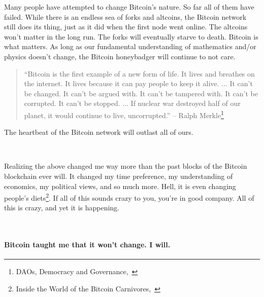 Many people have attempted to change Bitcoin's nature. So far all of
them have failed. While there is an endless sea of forks and altcoins,
the Bitcoin network still does its thing, just as it did when the first
node went online. The altcoins won't matter in the long run. The forks
will eventually starve to death. Bitcoin is what matters. As long as our
fundamental understanding of mathematics and/or physics doesn't change,
the Bitcoin honeybadger will continue to not care.

\begin{quotation}
``Bitcoin is the first example of a new form of life. It lives and
breathes on the internet. It lives because it can pay people to keep
it alive. ... It can't be changed. It can't be argued with. It
can't be tampered with. It can't be corrupted. It can't be stopped.
... If nuclear war destroyed half of our planet, it would continue
to live, uncorrupted.''
\flushright -- Ralph Merkle\footnote{DAOs, Democracy and
Governance,~\cite{merkle-dao}}
\end{quotation}

The heartbeat of the Bitcoin network will outlast all of ours.

~

Realizing the above changed me way more than the past blocks of the Bitcoin
blockchain ever will. It changed my time preference, my understanding of
economics, my political views, and so much more. Hell, it is even changing
people's diets\footnote{Inside the World of the Bitcoin
Carnivores,~\cite{carnivores}}. If all of this sounds crazy to you, you're in
good company. All of this is crazy, and yet it is happening.

~

\paragraph{Bitcoin taught me that it won't change. I will.}

